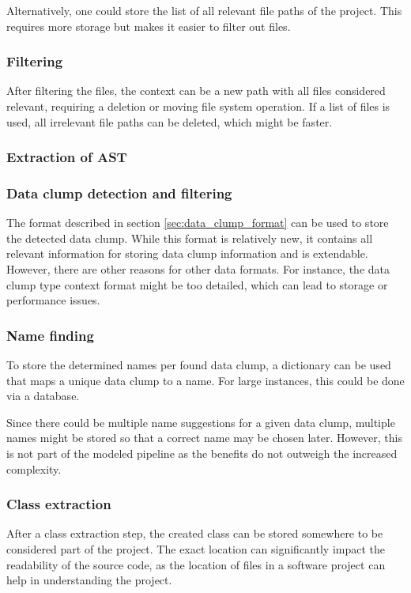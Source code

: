 Alternatively, one could store the list of all relevant file paths of the project. This requires more storage but makes it easier to filter out files. 

\subsubsection{Filtering}
After filtering the files, the context can be a new path with all files considered relevant, requiring a deletion or moving file system operation. If a list of files is used, all irrelevant file paths can be deleted, which might be faster.

\subsubsection{Extraction of AST}
\subsubsection{Data clump detection and filtering}

The format described in section \ref{sec:data_clump_format} can be used to store the detected data clump. While this format is relatively new, it contains all relevant information for storing data clump information and is extendable. However, there are other reasons for other data formats. For instance,  the data clump type context format might be too detailed, which can lead to storage or performance issues. 

\subsubsection{Name finding}
To store the determined names per found data clump, a dictionary can be used that maps a unique data clump to a name. For large instances, this could be done via a database. 

Since there could be multiple name suggestions for a given data clump, multiple names might be stored so that a correct name may be chosen later. However, this is not part of the modeled pipeline as the benefits do not outweigh the increased complexity.

\subsubsection{Class extraction}

After a class extraction step, the created class can be stored somewhere to be considered part of the project. The exact location can significantly impact the readability of the source code, as the location of files in a software project can help in understanding the project. 

